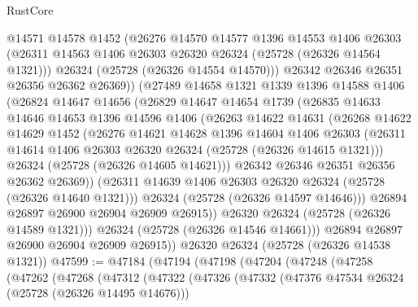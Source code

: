 \begin{lexlean}{RustCore}
\begin{coremodule}
              @14571
              @14578
              @1452
              (@26276
                @14570
                @14577
                @1396
                @14553
                @1406
                @26303
                (@26311 @14563 @1406 @26303 @26320 @26324 (@25728 (@26326 @14564 @1321)))
                @26324
                (@25728 (@26326 @14554 @14570)))
              @26342
              @26346
              @26351
              @26356
              @26362
              @26369))
          (@27489
            @14658
            @1321
            @1339
            @1396
            @14588
            @1406
            (@26824
              @14647
              @14656
              (@26829
                @14647
                @14654
                @1739
                (@26835
                  @14633
                  @14646
                  @14653
                  @1396
                  @14596
                  @1406
                  (@26263
                    @14622
                    @14631
                    (@26268
                      @14622
                      @14629
                      @1452
                      (@26276
                        @14621
                        @14628
                        @1396
                        @14604
                        @1406
                        @26303
                        (@26311 @14614 @1406 @26303 @26320 @26324 (@25728 (@26326 @14615 @1321)))
                        @26324
                        (@25728 (@26326 @14605 @14621)))
                      @26342
                      @26346
                      @26351
                      @26356
                      @26362
                      @26369))
                  (@26311 @14639 @1406 @26303 @26320 @26324 (@25728 (@26326 @14640 @1321)))
                  @26324
                  (@25728 (@26326 @14597 @14646)))
                @26894
                @26897
                @26900
                @26904
                @26909
                @26915))
            @26320
            @26324
            (@25728 (@26326 @14589 @1321)))
          @26324
          (@25728 (@26326 @14546 @14661)))
        @26894
        @26897
        @26900
        @26904
        @26909
        @26915))
    @26320
    @26324
    (@25728 (@26326 @14538 @1321))
@47599 := @47184
    (@47194
      (@47198
        (@47204
          (@47248
            (@47258
              (@47262
                (@47268
                  (@47312
                    (@47322
                      (@47326
                        (@47332
                          (@47376 @47534 @26324 (@25728 (@26326 @14495 @14676)))

\end{coremodule}
\end{lexlean}
